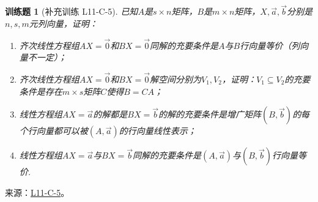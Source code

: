 \documentclass[12pt,fontset=fandol]{ctexart}
\newtheorem{exercise}{训练题}[section]
\begin{document}
\begin{exercise}[补充训练 L11-C-5]\label{prob:L11-C-5}
已知$A$是$s \times n$矩阵，$B$是$m \times n$矩阵，$X,\vec{a},\vec{b}$分别是$n,s,m$元列向量，证明：
        \begin{enumerate}
            \item 齐次线性方程组$AX=\vec{0}$和$BX=\vec{0}$同解的充要条件是$A$与$B$行向量等价（列向量不一定）；

            \item 齐次线性方程组$AX=\vec{0}$和$BX=\vec{0}$解空间分别为$V_1,V_2$，证明：$V_1 \subseteq V_2$的充要条件是存在$m \times s$矩阵$C$使得$B=CA$；

            \item 线性方程组$AX=\vec{a}$的解都是$BX=\vec{b}$的解的充要条件是增广矩阵$(B,\vec{b})$的每个行向量都可以被$(A,\vec{a})$的行向量线性表示；

            \item 线性方程组$AX=\vec{a}$与$BX=\vec{b}$同解的充要条件是$(A,\vec{a})$与$(B,\vec{b})$行向量等价.
        \end{enumerate}
\end{exercise}
\noindent 来源：\href{https://github.com/yhwu-is/Linear-Algebra-Left-Undone/blob/new/%E8%AE%B2%E4%B9%89/%E4%B8%93%E9%A2%98/11%20%E6%9C%9D%E8%8A%B1%E5%A4%95%E6%8B%BE.tex}{L11-C-5}。
\end{document}
